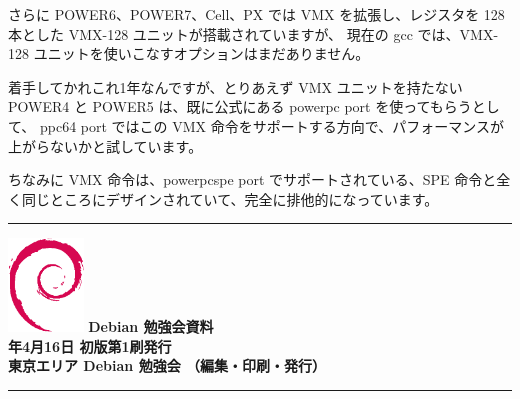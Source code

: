 \documentclass[mingoth,a4paper]{jsarticle}
\newcommand{\debmtgyear}{2011}
\newcommand{\debmtgmonth}{4}
\newcommand{\debmtgdate}{16}
\begin{document}
さらに POWER6、POWER7、Cell、PX では VMX を拡張し、レジスタを 128 本とした VMX-128 ユニットが搭載されていますが、
現在の gcc では、VMX-128 ユニットを使いこなすオプションはまだありません。

着手してかれこれ1年なんですが、とりあえず VMX ユニットを持たない POWER4 と POWER5 は、既に公式にある powerpc port を使ってもらうとして、
ppc64 port ではこの VMX 命令をサポートする方向で、パフォーマンスが上がらないかと試しています。

ちなみに VMX 命令は、powerpcspe port でサポートされている、SPE 命令と全く同じところにデザインされていて、完全に排他的になっています。

\printindex

\cleartooddpage

\vspace*{15cm}
\hrule
\vspace{2mm}
\includegraphics[width=2cm]{image200502/openlogo-nd.eps}
\noindent \Large \bf Debian 勉強会資料\\
\noindent \normalfont \debmtgyear{}年\debmtgmonth{}月\debmtgdate{}日 \hspace{5mm}  初版第1刷発行\\
\noindent \normalfont 東京エリア Debian 勉強会 （編集・印刷・発行）\\
\hrule
\end{document}
